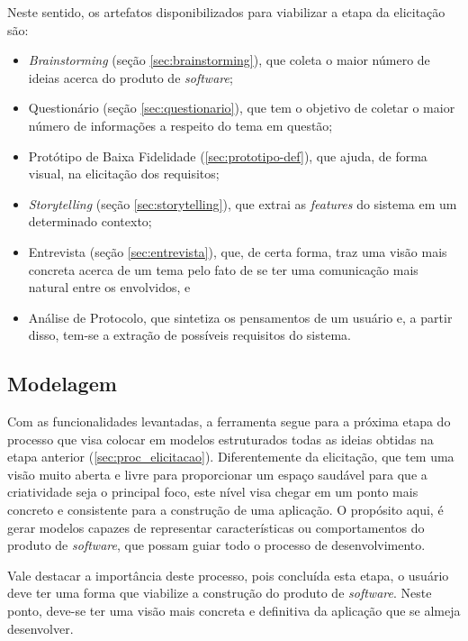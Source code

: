 Neste sentido, os artefatos disponibilizados para viabilizar a etapa da elicitação são:

\begin{itemize}
    \item \textit{Brainstorming} (seção \ref{sec:brainstorming}), que coleta o maior número de ideias acerca do produto de \textit{software};
    \item Questionário (seção \ref{sec:questionario}), que tem o objetivo de coletar o maior número de informações a respeito do tema em questão;
    \item Protótipo de Baixa Fidelidade (\ref{sec:prototipo-def}), que ajuda, de forma visual, na elicitação dos requisitos;
    \item \textit{Storytelling} (seção \ref{sec:storytelling}), que extrai as \textit{features} do sistema em um determinado contexto;
    \item Entrevista (seção \ref{sec:entrevista}), que, de certa forma, traz uma visão mais concreta acerca de um tema pelo fato de se ter uma comunicação mais natural entre os envolvidos, e
    \item Análise de Protocolo, que sintetiza os pensamentos de um usuário e, a partir disso, tem-se a extração de possíveis requisitos do sistema.
\end{itemize}

\subsection{Modelagem}

Com as funcionalidades levantadas, a ferramenta segue para a próxima etapa do processo que visa colocar em modelos estruturados todas as ideias obtidas na etapa anterior (\ref{sec:proc_elicitacao}). Diferentemente da elicitação, que tem uma visão muito aberta e livre para proporcionar um espaço saudável para que a criatividade seja o principal foco, este nível visa chegar em um ponto mais concreto e consistente para a construção de uma aplicação. O propósito aqui, é gerar modelos capazes de representar características ou comportamentos do produto de \textit{software}, que possam guiar todo o processo de desenvolvimento.

Vale destacar a importância deste processo, pois concluída esta etapa, o usuário deve ter uma forma que viabilize a construção do produto de \textit{software}. Neste ponto, deve-se ter uma visão mais concreta e definitiva da aplicação que se almeja desenvolver.

